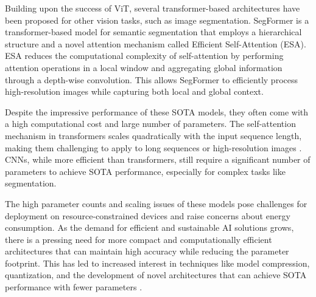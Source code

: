 \documentclass[conference]{IEEEtran}
\begin{document}
Building upon the success of ViT, several transformer-based architectures have been proposed for other vision tasks, such as image segmentation. SegFormer \cite{xie2021segformer} is a transformer-based model for semantic segmentation that employs a hierarchical structure and a novel attention mechanism called Efficient Self-Attention (ESA). ESA reduces the computational complexity of self-attention by performing attention operations in a local window and aggregating global information through a depth-wise convolution. This allows SegFormer to efficiently process high-resolution images while capturing both local and global context.

Despite the impressive performance of these SOTA models, they often come with a high computational cost and large number of parameters. The self-attention mechanism in transformers scales quadratically with the input sequence length, making them challenging to apply to long sequences or high-resolution images \cite{choromanski2022rethinking}. CNNs, while more efficient than transformers, still require a significant number of parameters to achieve SOTA performance, especially for complex tasks like segmentation.

The high parameter counts and scaling issues of these models pose challenges for deployment on resource-constrained devices and raise concerns about energy consumption. As the demand for efficient and sustainable AI solutions grows, there is a pressing need for more compact and computationally efficient architectures that can maintain high accuracy while reducing the parameter footprint. This has led to increased interest in techniques like model compression, quantization, and the development of novel architectures that can achieve SOTA performance with fewer parameters \cite{cheng2017survey, hinton2015distilling}.
\end{document}
